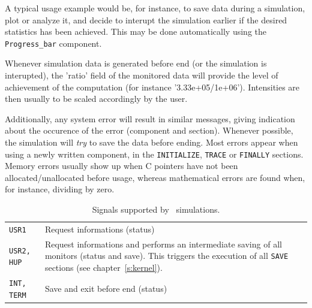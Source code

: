 A typical usage example would be, for instance, to save data during a
simulation, plot or analyze it, and decide to interupt the simulation
earlier if the desired statistics has been achieved. This may be done automatically using the \verb+Progress_bar+ component.

Whenever simulation data is generated before end (or the simulation is
interupted), the 'ratio' field of the monitored data will provide the
level of achievement of the computation (for instance
'3.33e+05/1e+06'). Intensities are then usually to be scaled
accordingly by the user.

Additionally, any system error will result in similar messages, giving
indication about the occurence of the error (component and
section). Whenever possible, the simulation will {\em try} to save the
data before ending. Most errors appear when using a newly written component, in the \texttt{INITIALIZE}, \texttt{TRACE} or \texttt{FINALLY} sections. Memory errors usually show up when C pointers have not been allocated/unallocated before usage, whereas mathematical errors are found when, for instance, dividing by zero.

\begin{table}
  \begin{center}
    {\let\my=\\
    \begin{tabular}{|p{}|p{}|}
      \hline
      \texttt{USR1} & Request informations (status)  \\
      \texttt{USR2, HUP} & Request informations and performs an intermediate saving of all monitors (status and save). This triggers the execution of all \texttt{SAVE} sections (see chapter~\ref{s:kernel}).  \\
      \texttt{INT, TERM} & Save and exit before end (status)  \\
      \hline
    \end{tabular}
    \caption{Signals supported by \MCS\ simulations.}
    \label{t:signals}
    }
  \end{center}
\end{table}

